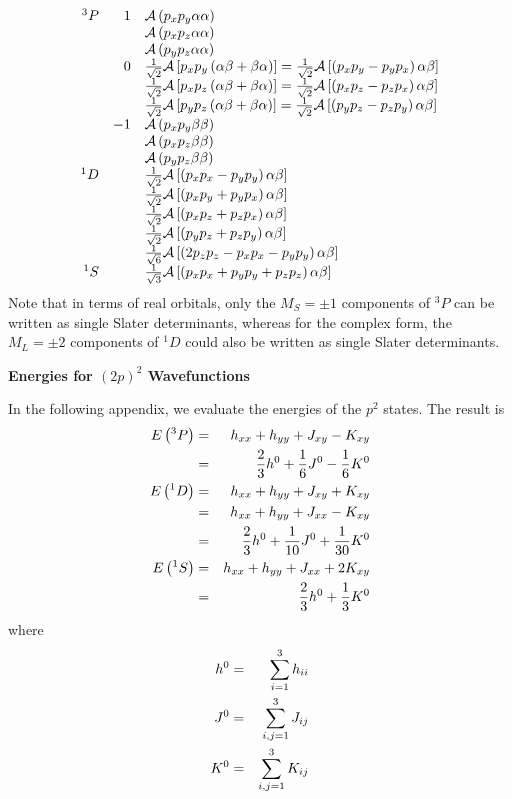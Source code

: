 \begin{equation}
\begin{array}{rrl}\\
{^3P} & 1 & {\cal A} \left( p_x p_y \alpha \alpha \right)\cr
&& {\cal A} \left( p_x p_z \alpha \alpha \right)\cr
&& {\cal A} \left( p_y p_z \alpha \alpha \right)\cr
&0 & {1 \over \sqrt{2}} {\cal A} \left[ p_x p_y \left( 
\alpha \beta + \beta \alpha \right) \right] = {1 \over \sqrt{2}} 
{\cal A} \left[ \left( p_x p_y - p_y p_x \right) \alpha \beta 
\right]\cr 
&&{1 \over \sqrt{2}} {\cal A} \left[ p_x p_z \left( \alpha \beta 
+ \beta \alpha \right) \right] = {1 \over \sqrt{2}} 
{\cal A} \left[ \left( p_x p_z - p_z p_x \right) \alpha \beta 
\right]\cr 
&&{1 \over \sqrt{2}} {\cal A} \left[ p_y p_z \left( \alpha 
\beta + \beta \alpha \right) \right] = {1 \over \sqrt{2}} {\cal A} 
\left[ \left( p_y p_z - p_z p_y \right) \alpha \beta \right]\cr
& -1 & {\cal A} \left( p_x p_y \beta \beta \right)\cr
&& {\cal A} \left( p_x p_z \beta \beta \right)\cr
&& {\cal A} \left( p_y p_z \beta \beta \right)\cr
{^1D} & & {1 \over \sqrt{2}} {\cal A} \left[ \left( p_x p_x -  
p_y p_y \right) \alpha \beta \right]\cr
&& {1 \over \sqrt{2}} {\cal A} \left[ \left( p_x p_y +  
p_y p_x \right) \alpha \beta \right]\cr
&& {1 \over \sqrt{2}} {\cal A} \left[ \left( p_x p_z +  
p_z p_x \right) \alpha \beta \right]\cr
&& {1 \over \sqrt{2}} {\cal A} \left[ \left( p_y p_z +  
p_z p_y \right) \alpha \beta \right]\cr
&& {1 \over \sqrt{6}} {\cal A} \left[ \left( 2 p_z p_z -  
p_x p_x - p_y p_y \right) \alpha \beta \right]\cr
{^1S} && {1 \over \sqrt{3}} {\cal A} \left[ \left( p_x p_x +  
p_y p_y + p_z p_z \right) \alpha \beta \right]
\end{array}
\end{equation}
Note that in terms of real orbitals, only the $M_S = \pm 1$ 
components of ${^3P}$ can be written as single Slater determinants, 
whereas for the complex form, the $M_L = \pm 2$ components of ${^1D}$ 
could also be written as single Slater determinants.

{\bf Energies for $(2p)^2$ Wavefunctions}

In the following appendix, we evaluate the energies of the $p^2$ 
states.  The result is
\begin{eqnarray}
E \left( {^3P} \right) &=& h_{xx} + h_{yy} + J_{xy} - K_{xy}\cr
&=& {2 \over 3} h^0 + {1 \over 6} J^0 - {1 \over 6} K^0\cr
E \left( {^1D} \right) &=& h_{xx} + h_{yy} + J_{xy} + K_{xy}\cr
&=& h_{xx} + h_{yy} + J_{xx} - K_{xy}\cr
&=& {2 \over 3} h^0 + {1 \over 10} J^0 + {1 \over 30} K^0\cr
E \left( {^1S} \right) &=& h_{xx} + h_{yy} + J_{xx} + 2K_{xy}\cr
&=& {2 \over 3} h^0 + {1 \over 3} K^0
\label{chap5app-eqno15}
\end{eqnarray}
where
\begin{eqnarray}
h^0 &=& \sum^{3}_{i=1} h_{ii}\cr
J^0 &=& \sum^{3}_{i,j=1} J_{ij}\cr
K^0 &=& \sum^{3}_{i,j=1} K_{ij}
\label{chap5app-eqno16}
\end{eqnarray}

